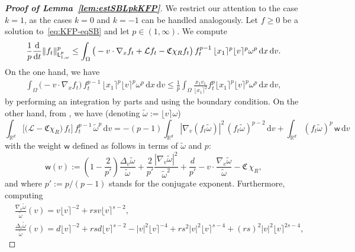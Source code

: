 \documentclass[11pt]{amsart}
\theoremstyle{definition}
\theoremstyle{remark}
\numberwithin{equation}{section}
\newcommand\R{{\mathbb R}}
\def\LL{{\mathcal L}}
\newcommand{\dd}{{\, \mathrm d}}
\newcommand{\dt}{\frac{{\rm d}}{{\rm d}t}}
\newcommand{\sfL}{\mathsf{L}}
\newcommand{\wangle}[1]{\lfloor #1 \rceil}
\begin{document}
\begin{proof}[{\bf Proof of Lemma~\ref{lem:estSBLpkKFP}}]
   We restrict our attention to the case $k=1$, as the cases $k=0$ and $k=-1$ can be handled analogously. Let $f \ge 0$ be a solution to~\eqref{eq:KFP-eqSB} and let $p \in (1,\infty)$. We compute
  \begin{equation*}
    \frac{1}{p}  \dt \| f_t \|_{\sfL^{p}_{1,\omega}}^p
    \le \int_{\Omega} \big(- v \cdot \nabla_x  f_t + \LL f_t - \mathfrak{C}\chi_R f_t \big) \, f_t ^{p-1}  \, \wangle{x_1}^p \wangle{v}^p \omega^p  \dd x \dd v.
  \end{equation*}
  On the one hand, we have
  \begin{align*}
    \int_{\Omega} \big(- v \cdot \nabla_x  f_t \big) \, f_t^{p-1}  \, \wangle{x_1}^p \wangle{v}^p \omega^p \dd x \dd v \le \frac{1}{p}
    \int_{\Omega} \frac{x_1 v_1}{\wangle{x_1}^2} f_t^p \wangle{x_1}^p \wangle{v}^p \omega^p  \dd x \dd v,
  \end{align*}
  by performing an integration by parts and using the boundary condition. On the other hand, from \cite[(3.18)]{MisMou}, we have (denoting $\tilde \omega := \wangle{v} \omega$)
  \begin{equation*}
    \int_{\R^d} \big[\big(\LL - \mathfrak{C}\chi_R\big) \, f_t \big]\, f_t ^{p-1}  \, \tilde \omega^p  \dd v = - (p-1) \int_{\R^d}  |\nabla_v (f_t \tilde \omega)|^2 \, (f_t \tilde \omega)^{p-2} \dd v + \int_{\R^d} (f_t \tilde \omega)^p \, \mathsf w \dd v
  \end{equation*}
  with the weight $\mathsf w$ defined as follows in terms of $\tilde \omega$ and $p$:
  \begin{equation}
    \label{eq:Def-psi-mp}
    \mathsf w(v) := \left( 1 - \frac{2}{p'} \right) \frac{\Delta_v \tilde \omega}{\tilde \omega} + \frac{2 }{p'} \frac{|\nabla_v \tilde \omega|^2}{\tilde \omega^2} + \frac{d }{p'} - v \cdot \frac{\nabla_v \tilde \omega }{\tilde \omega} - \mathfrak{C} \,
    \chi_R,
  \end{equation}
  and where $p' := p/(p-1)$ stands for the conjugate exponent. 
  Furthermore, computing
  \begin{align*}
    & \frac{\nabla_v \tilde \omega}{\tilde \omega} (v)=  v \wangle{v}^{-2} + rs v  \wangle{v}^{s-2}, 
    \\[2mm]
    & \frac{\Delta_v \tilde \omega}{\tilde \omega} (v) = d \wangle{v}^{-2} +  r sd \wangle{v}^{s-2} - |v|^2 \wangle{v}^{-4} +  rs^2  |v|^2 \wangle{v}^{s-4} +  (rs)^2  |v|^2 \wangle{v}^{2s-4} ,
  \end{align*}

\end{proof}
\end{document}

